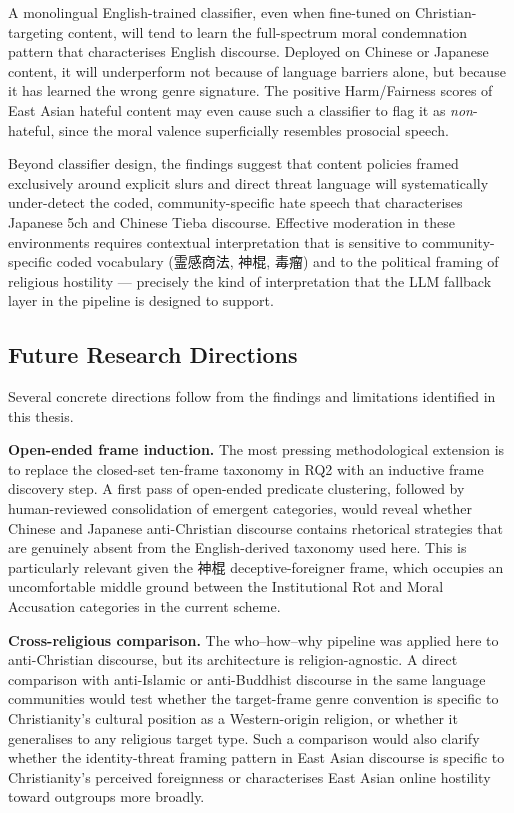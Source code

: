 \documentclass[../CLthesis.tex]{subfiles}
\begin{document}
A monolingual English-trained classifier, even when fine-tuned on Christian-targeting content, will tend to learn the full-spectrum moral condemnation pattern that characterises English discourse. Deployed on Chinese or Japanese content, it will underperform not because of language barriers alone, but because it has learned the wrong genre signature. The positive Harm/Fairness scores of East Asian hateful content may even cause such a classifier to flag it as \emph{non}-hateful, since the moral valence superficially resembles prosocial speech.

Beyond classifier design, the findings suggest that content policies framed exclusively around explicit slurs and direct threat language will systematically under-detect the coded, community-specific hate speech that characterises Japanese 5ch and Chinese Tieba discourse. Effective moderation in these environments requires contextual interpretation that is sensitive to community-specific coded vocabulary (霊感商法, 神棍, 毒瘤) and to the political framing of religious hostility --- precisely the kind of interpretation that the LLM fallback layer in the pipeline is designed to support.

\subsection{Future Research Directions}

Several concrete directions follow from the findings and limitations identified in this thesis.

\textbf{Open-ended frame induction.} The most pressing methodological extension is to replace the closed-set ten-frame taxonomy in RQ2 with an inductive frame discovery step. A first pass of open-ended predicate clustering, followed by human-reviewed consolidation of emergent categories, would reveal whether Chinese and Japanese anti-Christian discourse contains rhetorical strategies that are genuinely absent from the English-derived taxonomy used here. This is particularly relevant given the 神棍 deceptive-foreigner frame, which occupies an uncomfortable middle ground between the Institutional Rot and Moral Accusation categories in the current scheme.

\textbf{Cross-religious comparison.} The who--how--why pipeline was applied here to anti-Christian discourse, but its architecture is religion-agnostic. A direct comparison with anti-Islamic or anti-Buddhist discourse in the same language communities would test whether the target-frame genre convention is specific to Christianity's cultural position as a Western-origin religion, or whether it generalises to any religious target type. Such a comparison would also clarify whether the identity-threat framing pattern in East Asian discourse is specific to Christianity's perceived foreignness or characterises East Asian online hostility toward outgroups more broadly.
\end{document}
